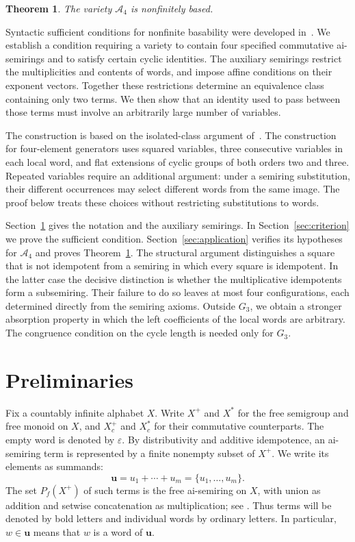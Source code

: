 \documentclass[11pt,reqno]{amsart}
\newtheorem{theorem}{Theorem}[section]
\theoremstyle{remark}
\newcommand{\A}{\mathcal A_4}
\newcommand{\eps}{\varepsilon}
\newcommand{\bu}{\mathbf u}
\numberwithin{equation}{section}
\begin{document}
\begin{theorem}\label{thm:main}
The variety $\A$ is nonfinitely based.
\end{theorem}

Syntactic sufficient conditions for nonfinite basability were developed
in~\cite{YR124,YRG,LRY}. We establish a condition requiring a variety to
contain four specified commutative ai-semirings and to satisfy certain
cyclic identities. The auxiliary semirings restrict the multiplicities and
contents of words, and impose affine conditions on their exponent vectors.
Together these restrictions determine an equivalence class containing only
two terms. We then show that an identity used to pass between those terms
must involve an arbitrarily large number of variables.

The construction is based on the isolated-class argument of~\cite{WJW}.
The construction for four-element generators uses squared variables,
three consecutive variables in each local word, and flat extensions of
cyclic groups of both orders two and three. Repeated variables require an additional argument:
under a semiring substitution, their different occurrences may select
different words from the same image. The proof below treats these choices
without restricting substitutions to words.

Section~\ref{sec:prelim} gives the notation and the auxiliary semirings.
In Section~\ref{sec:criterion} we prove the sufficient condition.
Section~\ref{sec:application} verifies its hypotheses for $\A$ and proves
Theorem~\ref{thm:main}. The structural argument distinguishes a square
that is not idempotent from a semiring in which every square is idempotent.
In the latter case the decisive distinction is whether the multiplicative
idempotents form a subsemiring. Their failure to do so leaves at most four
configurations, each determined directly from the semiring axioms. Outside $G_3$, we obtain a stronger absorption property in which
the left coefficients of the local words are arbitrary. The congruence
condition on the cycle length is needed only for $G_3$.

\section{Preliminaries}\label{sec:prelim}

Fix a countably infinite alphabet $X$. Write $X^+$ and $X^*$ for the free
semigroup and free monoid on $X$, and $X_c^+$ and $X_c^*$ for their
commutative counterparts. The empty word is denoted by $\eps$. By
distributivity and additive idempotence, an ai-semiring term is represented
by a finite nonempty subset of $X^+$. We write its elements as summands:
\[
\bu=u_1+\cdots+u_m=\{u_1,\ldots,u_m\}.
\]
The set $P_f(X^+)$ of such terms is the free ai-semiring on $X$, with union
as addition and setwise concatenation as multiplication; see
\cite[Section~1]{RLLC}. Thus terms will be denoted by bold letters and
individual words by ordinary letters. In particular, $w\in\bu$ means that
$w$ is a word of $\bu$.
\end{document}
